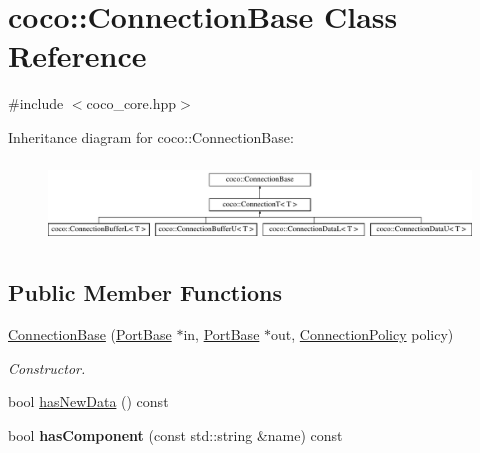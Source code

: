 \hypertarget{classcoco_1_1_connection_base}{}\section{coco\+:\+:Connection\+Base Class Reference}
\label{classcoco_1_1_connection_base}


{\ttfamily \#include $<$coco\+\_\+core.\+hpp$>$}

Inheritance diagram for coco\+:\+:Connection\+Base\+:\begin{figure}[H]
\begin{center}
\leavevmode
\includegraphics[height=2.187500cm]{classcoco_1_1_connection_base}
\end{center}
\end{figure}
\subsection*{Public Member Functions}
\begin{DoxyCompactItemize}
\item 
\hypertarget{classcoco_1_1_connection_base_aecb0c585cd9313e30f7d592ed08c6059}{}\hyperlink{classcoco_1_1_connection_base_aecb0c585cd9313e30f7d592ed08c6059}{Connection\+Base} (\hyperlink{classcoco_1_1_port_base}{Port\+Base} $\ast$in, \hyperlink{classcoco_1_1_port_base}{Port\+Base} $\ast$out, \hyperlink{structcoco_1_1_connection_policy}{Connection\+Policy} policy)\label{classcoco_1_1_connection_base_aecb0c585cd9313e30f7d592ed08c6059}

\begin{DoxyCompactList}\small\item\em Constructor. \end{DoxyCompactList}\item 
bool \hyperlink{classcoco_1_1_connection_base_aca4a3ab712e816089a1ee35cb0546d8d}{has\+New\+Data} () const 
\item 
\hypertarget{classcoco_1_1_connection_base_ac30b073f630b45c3e7f272378dd8945c}{}bool {\bfseries has\+Component} (const std\+::string \&name) const \label{classcoco_1_1_connection_base_ac30b073f630b45c3e7f272378dd8945c}

\end{DoxyCompactItemize}
